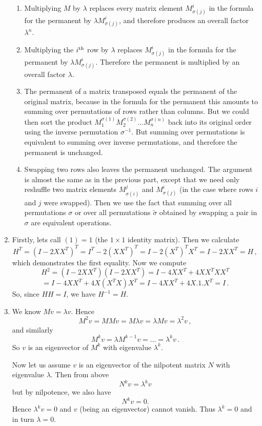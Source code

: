 \begin{enumerate}
\begin{enumerate}
\item Multiplying $M$ by $\lambda$ replaces every matrix element $M^i_{\sigma(j)}$ in the formula for the permanent
by $\lambda M^i_{\sigma(j)}$, and therefore produces an overall factor $\lambda^n$.
\item Multiplying the $i^{\rm th}$ row by $\lambda$ replaces $M^i_{\sigma(j)}$ in the formula for the permanent
by $\lambda M^i_{\sigma(j)}$. Therefore the permanent is multiplied by an overall factor $\lambda$.
\item The permanent of a matrix transposed equals the permanent of the original matrix, because
in the formula for the permanent this amounts to summing over permutations of rows rather than columns. But we could
then sort the product $M^{\sigma(1)}_1 M^{\sigma(2)}_2\ldots M^{\sigma(n)}_n$ back into its original order using the inverse permutation
 $\sigma^{-1}$. But summing over permutations is equivalent to summing over inverse permutations, and therefore the permanent is unchanged.
\item Swapping two rows also leaves the permanent unchanged. The argument is almost the same as in the previous part, except 
that we need only reshuffle two matrix elements $M^j_{\sigma(i)}$ and $M^i_{\sigma(j)}$ (in the case where rows $i$ and $j$ were swapped).
Then we use the fact that summing over all permutations $\sigma$ or over all permutations $\widetilde \sigma$ obtained
by swapping a pair in $\sigma$ are equivalent operations.
\end{enumerate}

\item Firstly, lets call $(1)=1$ (the $1\times 1$ identity matrix). Then we calculate
\[
H^T=(I-2 X X^T)^T = I^T -2 (X X^T)^T = I -2 (X^T)^T X^T = I - 2 X X^T = H\, ,
\]
which demonstrates the first equality. Now we compute
\[
H^2 = (I-2 X X^T) (I - 2 X X^T) = I - 4 X X^T + 4 X X^T X X^T \] \[= I - 4 X X^T + 4 X (X^T X) X^T = I - 4 X X^T + 4 X.  1  .X^T = I\, .
\]
So, since $HH=I$, we have $H^{-1}=H$.

\item We know $Mv=\lambda v$. Hence 
\[
M^2 v = M M v = M \lambda v = \lambda M v = \lambda^2 v\, , 
\]
and similarly
\[
M^k v = \lambda M^{k-1} v = \ldots = \lambda^k v \, .
\]
So $v$ is an eigenvector of $M^k$ with eigenvalue $\lambda^k$.

Now let us assume $v$ is an eigenvector of the nilpotent matrix $N$ with eigenvalue $\lambda$. Then from above
\[
N^k v = \lambda^k v
\]
but by nilpotence, we also have
\[
N^k v = 0.
\]
Hence $\lambda^k v = 0$ and $v$ (being an eigenvector) cannot vanish. Thus $\lambda^k=0$ and in turn $\lambda=0$.


\end{enumerate}
